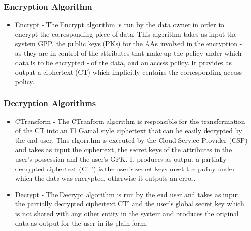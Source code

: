 \subsubsection*{Encryption Algorithm}
\begin{itemize}
	\item Encrypt - The Encrypt algorithm is run by the data owner in order to encrypt the corresponding piece of data. This algorithm takes as input the system GPP, the public keys (PKs) for the AAs involved in the encryption - as they are in control of the attributes that make up the policy under which data is to be encrypted - of the data, and an access policy. It provides as output a ciphertext (CT) which implicitly contains the corresponding access policy.
\end{itemize}

\subsubsection*{Decryption Algorithms}
\begin{itemize}
	\item CTransform - The CTranform algorithm is responsible for the transformation of the CT into an El Gamal style ciphertext that can be easily decrypted by the end user. This algorithm is executed by the Cloud Service Provider (CSP) and takes as input the ciphertext, the secret keys of the attributes in the user's possession and the user's GPK. It produces as output a partially decrypted ciphertext (CT') is the user's secret keys meet the policy under which the data was encrypted, otherwise it outputs an error.
	
	\item Decrypt - The Decrypt algorithm is run by the end user and takes as input the partially decrypted ciphertext CT' and the user's global secret key which is not shared with any other entity in the system and produces the original data as output for the user in its plain form.
\end{itemize}

